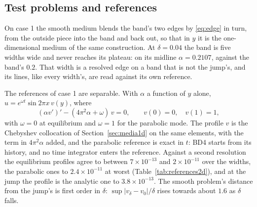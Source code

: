 \documentclass[11pt]{amsart}
\theoremstyle{definition}
\theoremstyle{remark}
\newcommand{\sci}[2]{#1 \times 10^{#2}}
\begin{document}
\subsection{Test problems and references}
\label{sec:problems2d}
On case 1 the smooth medium blends the band's two edges by \eqref{eq:edge} in
turn, from the outside piece into the band and back out, so that in $y$ it is
the one-dimensional medium of the same construction. At $\delta = 0.04$ the
band is five widths wide and never reaches its plateau: on its midline
$\alpha = 0.2107$, against the band's $0.2$. That width is a resolved edge on
a band that is not the jump's, and its lines, like every width's, are read
against its own reference.

The references of case 1 are separable. With $\alpha$ a function of $y$
alone, $u = e^{\omega t} \sin 2\pi x\, v(y)$, where
\begin{equation*}
  (\alpha v')' - (4\pi^2 \alpha + \omega)\, v = 0, \qquad v(0) = 0, \quad v(1) = 1,
\end{equation*}
with $\omega = 0$ at equilibrium and $\omega = 1$ for the parabolic mode. The profile
$v$ is the Chebyshev collocation of Section~\ref{sec:media1d} on the same
elements, with the term in $4\pi^2 \alpha$ added, and the parabolic reference
is exact in $t$: BD4 starts from its history, and no time integrator enters
the reference. Against a second resolution the equilibrium profiles agree to
between $\sci{7}{-13}$ and $\sci{2}{-11}$ over the widths, the parabolic ones
to $\sci{2.4}{-11}$ at worst (Table~\ref{tab:references2d}), and at the jump
the profile is the analytic one to $\sci{3.8}{-13}$. The smooth problem's
distance from the jump's is first order in $\delta$: $\sup |v_\delta - v_0|
/ \delta$ rises towards about $1.6$ as $\delta$ falls.
\end{document}
